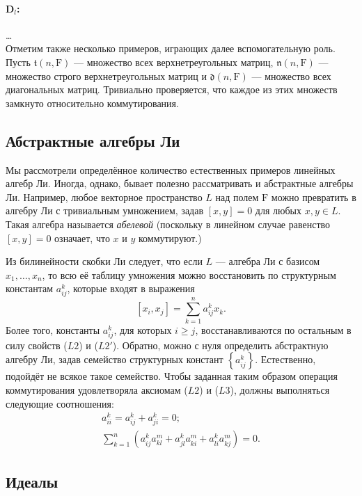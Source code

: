 \documentclass[a4paper, 12pt]{article}
\theoremstyle{definition}
\begin{document}
\paragraph{\( \mathbf{D}_l \):} \ldots \\

Отметим также несколько примеров, играющих далее вспомогательную роль. Пусть \( \mathfrak{t}(n, \mathrm F) \) --- множество всех верхнетреугольных матриц, \( \mathfrak{n}(n, \mathrm F) \) --- множество строго верхнетреугольных матриц и \( \mathfrak{d}(n, \mathrm F) \) --- множество всех диагональных матриц. Тривиально проверяется, что каждое из этих множеств замкнуто относительно коммутирования.

\subsection{Абстрактные алгебры Ли}
Мы рассмотрели определённое количество естественных примеров линейных алгебр Ли. Иногда, однако, бывает полезно рассматривать и абстрактные алгебры Ли. Например, любое векторное пространство \({ L }\) над полем \({ \mathrm F }\) можно превратить в алгебру Ли с тривиальным умножением, задав \({ [x, y] = 0 }\) для любых \({ x, y \in L }\). Такая алгебра называется \textit{абелевой} (поскольку в линейном случае равенство \({ [x, y] = 0 }\) означает, что \({ x }\) и \({ y }\) коммутируют.)

Из билинейности скобки Ли следует, что если \({ L }\) --- алгебра Ли с базисом \({ x_1, \ldots, x_n }\), то всю её таблицу умножения можно восстановить по структурным константам \({ a^{k}_{ij} }\), которые входят в выражения
\[
    [x_i, x_j] = \sum_{k=1}^{n} a^{k}_{ij} x_k.
\]
Более того, константы \({ a^{k}_{ij} }\), для которых \({ i \geqslant j }\), восстанавливаются по остальным в силу свойств (\({ L 2 }\)) и (\({ L 2' }\)). Обратно, можно с нуля определить абстрактную алгебру Ли, задав семейство структурных констант \({ \left\{ a^{k}_{ij} \right\} }\). Естественно, подойдёт не всякое такое семейство. Чтобы заданная таким образом операция коммутирования удовлетворяла аксиомам (\({ L 2 }\)) и (\({ L 3 }\)), должны выполняться следующие соотношения:
\[
    \begin{gathered}
        a^{k}_{ii} = a^{k}_{ij} + a^{k}_{ji} = 0; \\
        \sum_{k=1}^{n} \left( a^{k}_{ij} a^{m}_{kl} + a^{k}_{jl} a^{m}_{ki} + a^{k}_{li} a^{m}_{kj} \right) = 0.
    \end{gathered}
\]

\subsection{Идеалы}
\end{document}
